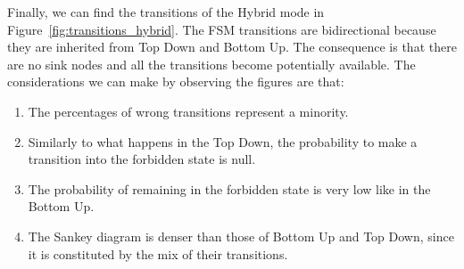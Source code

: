 Finally, we can find the transitions of the Hybrid mode in Figure~\ref{fig:transitions_hybrid}. The FSM transitions are bidirectional because they are inherited from Top Down and Bottom Up. The consequence is that there are no sink nodes and all the transitions become potentially available. The considerations we can make by observing the figures are that:
\begin{enumerate}
    \item The percentages of wrong transitions represent a minority.
    \item Similarly to what happens in the Top Down, the probability to make a transition into the forbidden state is null.
    \item The probability of remaining in the forbidden state is very low like in the Bottom Up.
    \item The Sankey diagram is denser than those of Bottom Up and Top Down, since it is constituted by the mix of their transitions.
\end{enumerate}

